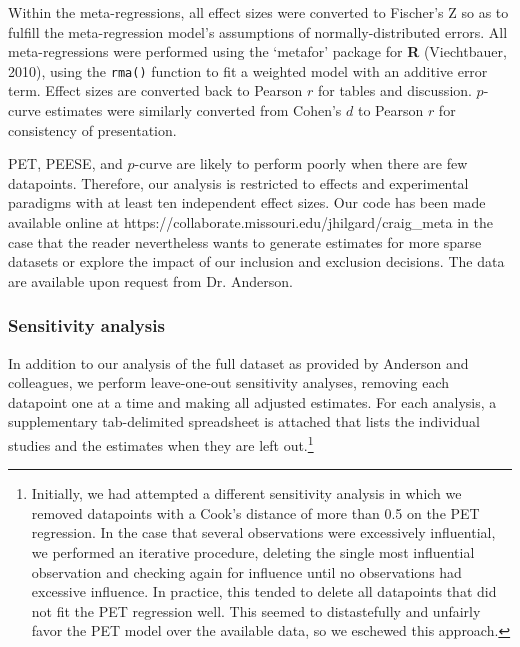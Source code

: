 \documentclass[man]{apa6}
\begin{document}
Within the meta-regressions, all effect sizes were converted to Fischer's Z so as to fulfill the meta-regression model's assumptions of normally-distributed errors. All meta-regressions were performed using the `metafor' package for {\bf R} (Viechtbauer, 2010), using the {\tt rma()} function to fit a weighted model with an additive error term. Effect sizes are converted back to Pearson $r$ for tables and discussion. 
$p$-curve estimates were similarly converted from Cohen's $d$ to Pearson $r$ for consistency of presentation.
\nocite{Viechtbauer:2010} %

PET, PEESE, and $p$-curve are likely to perform poorly when there are few datapoints. Therefore, our analysis is restricted to effects and experimental paradigms with at least ten independent effect sizes. %
Our code has been made available online at https://collaborate.missouri.edu/jhilgard/craig\_meta in the case that the reader nevertheless wants to generate estimates for more sparse datasets or explore the impact of our inclusion and exclusion decisions. The data are available upon request from Dr. Anderson. %

\subsubsection{Sensitivity analysis}
In addition to our analysis of the full dataset as provided by Anderson and colleagues, we perform leave-one-out sensitivity analyses, removing each datapoint one at a time and making all adjusted estimates. For each analysis, a supplementary tab-delimited spreadsheet is attached that lists the individual studies and the estimates when they are left out.\footnote{Initially, we had attempted a different sensitivity analysis in which we removed datapoints with a Cook's distance of more than 0.5 on the PET regression. In the case that several observations were excessively influential, we performed an iterative procedure, deleting the single most influential observation and checking again for influence until no observations had excessive influence. In practice, this tended to delete all datapoints that did not fit the PET regression well. This seemed to distastefully and unfairly favor the PET model over the available data, so we eschewed this approach.} %
\end{document}
